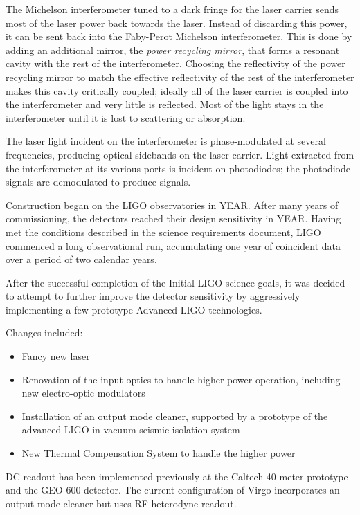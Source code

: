 \cite{Fritschel2001Readout}

The Michelson interferometer tuned to a dark fringe for the laser
carrier sends most of the laser power back towards the laser.  Instead
of discarding this power, it can be sent back into the Faby-Perot
Michelson interferometer.  This is done by adding an additional
mirror, the \emph{power recycling mirror}, that forms a resonant
cavity with the rest of the interferometer.  Choosing the reflectivity
of the power recycling mirror to match the effective reflectivity of
the rest of the interferometer makes this cavity critically coupled;
ideally all of the laser carrier is coupled into the interferometer
and very little is reflected.  Most of the light stays in the
interferometer until it is lost to scattering or absorption.


The laser light incident on the interferometer is phase-modulated at
several frequencies, producing optical sidebands on the laser carrier.
Light extracted from the interferometer at its various ports is
incident on photodiodes; the photodiode signals are demodulated to
produce signals.


Construction began on the LIGO observatories in YEAR.  After many
years of commissioning, the detectors reached their design sensitivity
in YEAR.  Having met the conditions described in the science
requirements document, LIGO commenced a long observational run,
accumulating one year of coincident data over a period of two calendar
years.


After the successful completion of the Initial LIGO science goals, it
was decided
\cite{Adhikari2006Enhanced,T050252,JoshSmithEnhancedAdvanced} to
attempt to further improve the detector sensitivity by aggressively
implementing a few prototype Advanced LIGO technologies.

Changes included:
\begin{itemize}
\item Fancy new laser
\item Renovation of the input optics to handle higher power operation, including new electro-optic modulators \cite{Quetschke2008ElectroOptic}
\item Installation of an output mode cleaner, supported by a prototype of the advanced LIGO in-vacuum seismic isolation system
\item New Thermal Compensation System to handle the higher power
\end{itemize}

DC readout has been implemented previously at the Caltech 40 meter
prototype \cite{Ward2008DC,RobWardThesis} and the GEO 600
detector\cite{GeoDC,Prijatelj2010,Degallaix2010Commissioning}.  The
current configuration of Virgo incorporates an output mode cleaner but
uses RF heterodyne readout\cite{Acernese2008Virgo}.



